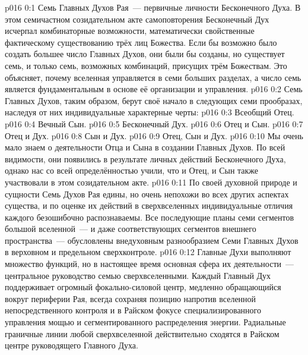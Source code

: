 \author{Всеобщий Цензор}
\vs p016 0:1 Семь Главных Духов Рая~--- первичные личности Бесконечного Духа. В этом семичастном созидательном акте самоповторения Бесконечный Дух исчерпал комбинаторные возможности, математически свойственные фактическому существованию трёх лиц Божества. Если бы возможно было создать большее число Главных Духов, они были бы созданы, но существует семь, и только семь, возможных комбинаций, присущих трём Божествам. Это объясняет, почему вселенная управляется в семи больших разделах, а число семь является фундаментальным в основе её организации и управления.
\vs p016 0:2 Семь Главных Духов, таким образом, берут своё начало в следующих семи прообразах, наследуя от них индивидуальные характерные черты:
\vs p016 0:3 Всеобщий Отец.
\vs p016 0:4 Вечный Сын.
\vs p016 0:5 Бесконечный Дух.
\vs p016 0:6 Отец и Сын.
\vs p016 0:7 Отец и Дух.
\vs p016 0:8 Сын и Дух.
\vs p016 0:9 Отец, Сын и Дух.
\vs p016 0:10 \pc Мы очень мало знаем о деятельности Отца и Сына в создании Главных Духов. По всей видимости, они появились в результате личных действий Бесконечного Духа, однако нас со всей определённостью учили, что и Отец, и Сын также участвовали в этом созидательном акте.
\vs p016 0:11 По своей духовной природе и сущности Семь Духов Рая едины, но очень непохожи во всех других аспектах существа, и по оценке их действий в сверхвселенных индивидуальные отличия каждого безошибочно распознаваемы. Все последующие планы семи сегментов большой вселенной~--- и даже соответствующих сегментов внешнего пространства~--- обусловлены внедуховным разнообразием Семи Главных Духов в верховном и предельном сверхконтроле.
\vs p016 0:12 Главные Духи выполняют множество функций, но в настоящее время основная сфера их деятельности~--- центральное руководство семью сверхвселенными. Каждый Главный Дух поддерживает огромный фокально\hyp{}силовой центр, медленно обращающийся вокруг периферии Рая, всегда сохраняя позицию напротив вселенной непосредственного контроля и в Райском фокусе специализированного управления мощью и сегментированного распределения энергии. Радиальные граничные линии любой сверхвселенной действительно сходятся в Райском центре руководящего Главного Духа.

